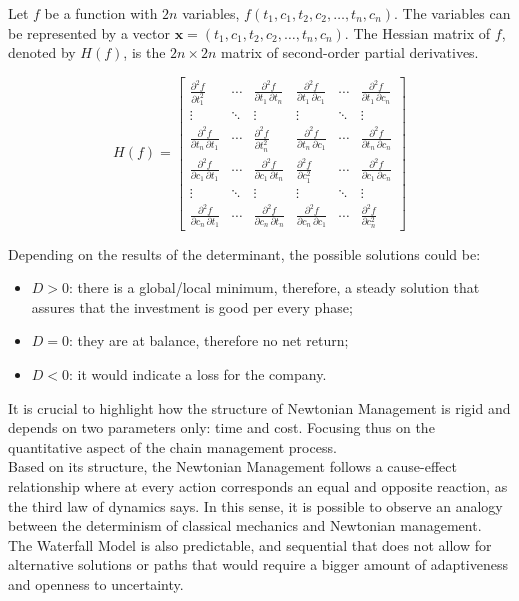 \documentclass{article}
\begin{document}
Let $f$ be a function with $2n$ variables, $f(t_1, c_1, t_2, c_2, \ldots, t_n, c_n)$.
The variables can be represented by a vector $\mathbf{x} = (t_1, c_1, t_2, c_2, \ldots, t_n, c_n)$.
The Hessian matrix of $f$, denoted by $H(f)$, is the $2n \times 2n$ matrix of second-order partial derivatives.

$$
H(f) =
\begin{bmatrix}
\frac{\partial^2 f}{\partial t_1^2} & \cdots & \frac{\partial^2 f}{\partial t_1\,\partial t_n} & \frac{\partial^2 f}{\partial t_1\,\partial c_1} & \cdots & \frac{\partial^2 f}{\partial t_1\,\partial c_n} \\
\vdots & \ddots & \vdots & \vdots & \ddots & \vdots \\
\frac{\partial^2 f}{\partial t_n\,\partial t_1} & \cdots & \frac{\partial^2 f}{\partial t_n^2} & \frac{\partial^2 f}{\partial t_n\,\partial c_1} & \cdots & \frac{\partial^2 f}{\partial t_n\,\partial c_n} \\
\frac{\partial^2 f}{\partial c_1\,\partial t_1} & \cdots & \frac{\partial^2 f}{\partial c_1\,\partial t_n} & \frac{\partial^2 f}{\partial c_1^2} & \cdots & \frac{\partial^2 f}{\partial c_1\,\partial c_n} \\
\vdots & \ddots & \vdots & \vdots & \ddots & \vdots \\
\frac{\partial^2 f}{\partial c_n\,\partial t_1} & \cdots & \frac{\partial^2 f}{\partial c_n\,\partial t_n} & \frac{\partial^2 f}{\partial c_n\,\partial c_1} & \cdots & \frac{\partial^2 f}{\partial c_n^2}
\end{bmatrix}
$$

Depending on the results of the determinant, the possible solutions could be:
\begin{itemize}
    \item $D > 0$: there is a global/local minimum, therefore, a steady solution that assures that the investment is good per every phase;
    \item $D = 0$: they are at balance, therefore no net return;
    \item $D < 0$: it would indicate a loss for the company.
\end{itemize}

It is crucial to highlight how the structure of Newtonian Management is rigid and depends on two parameters only: time and cost. Focusing thus on the quantitative aspect of the chain management process.\\ 
Based on its structure, the Newtonian Management follows a cause-effect relationship where at every action corresponds an equal and opposite reaction, as the third law of dynamics says. In this sense, it is possible to observe an analogy between the determinism of classical mechanics and Newtonian management.\\ The Waterfall Model is also predictable, and sequential that does not allow for alternative solutions or paths that would require a bigger amount of adaptiveness and openness to uncertainty.
\end{document}
